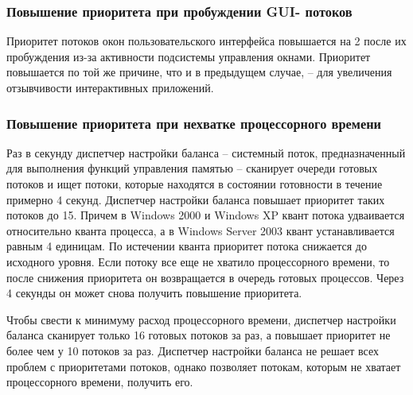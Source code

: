 \subsubsection*{Повышение приоритета при пробуждении GUI- потоков}

Приоритет потоков окон пользовательского интерфейса повышается на 2 после их пробуждения из-за активности подсистемы управления окнами. Приоритет повышается по той же причине, что и в предыдущем случае, -- для увеличения отзывчивости интерактивных приложений.

\subsubsection*{Повышение приоритета при нехватке процессорного времени}


Раз в секунду диспетчер настройки баланса -- системный поток, предназначенный для выполнения функций управления памятью – сканирует очереди готовых потоков и ищет потоки, которые находятся в состоянии готовности в течение примерно 4 секунд. Диспетчер настройки баланса повышает приоритет таких потоков до 15. Причем в Windows 2000 и Windows XP квант потока удваивается относительно кванта процесса, а в Windows Server 2003 квант устанавливается равным 4 единицам. По истечении кванта приоритет потока снижается до исходного уровня. Если потоку все еще не хватило процессорного времени, то после снижения приоритета он возвращается в очередь готовых процессов. Через 4 секунды он может снова получить повышение приоритета.

Чтобы свести к минимуму расход процессорного времени, диспетчер настройки баланса сканирует только 16 готовых потоков за раз, а повышает приоритет не более чем у 10 потоков за раз. Диспетчер настройки баланса не решает всех проблем с приоритетами потоков, однако позволяет потокам, которым не хватает процессорного времени, получить его.

